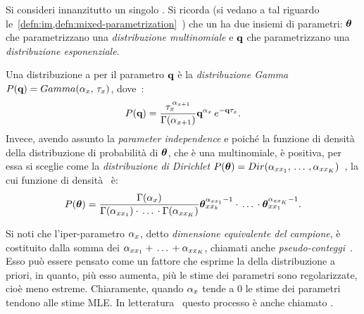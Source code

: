 Si consideri innanzitutto un singolo \mprocess*{}. Si ricorda (si vedano a tal riguardo le~\cref{defn:im,defn:mixed-parametrization}~) che un \mprocess*{} ha due insiemi di parametri: $\boldsymbol{\textbf{\text{$\theta$}}}$ che parametrizzano una \emph{distribuzione multinomiale} e $\boldsymbol{\textbf{\text{q}}}$ che parametrizzano una \emph{distribuzione esponenziale}.

Una distribuzione a  per il parametro $\boldsymbol{\textbf{\text{q}}}$ è la \emph{distribuzione Gamma} $P(\boldsymbol{\textbf{\text{q}}})=Gamma(\alpha_{\mathnormal{x}},\,\tau_{\mathnormal{x}})$, dove~\citep[si veda][]{Nodelman2007}:
\begin{equation}\label{eq:ctbn-bayesian-params-gamma}
P(\boldsymbol{\textbf{\text{q}}})=\frac{ \tau_{\mathnormal{x}}^{\,\alpha_{\mathnormal{x}+1}} }{ \Gamma(\alpha_{\mathnormal{x}+1}) } \boldsymbol{\textbf{\text{q}}}^{ \alpha_{\mathnormal{x}} } \, e^{ -\boldsymbol{\textbf{\text{q}}}\tau_{\mathnormal{x}} } \text{.}
\end{equation}
Invece, avendo assunto la \emph{parameter independence} e poiché la funzione di densità della distribuzione di probabilità di $\boldsymbol{\textbf{\text{$\theta$}}}$, che è una multinomiale, è positiva, per essa si sceglie come  la \emph{distribuzione di Dirichlet} $P(\boldsymbol{\textbf{\text{$\theta$}}})=Dir(\alpha_{\mathnormal{x}\mathnormal{x}_1},\,\dotsc\,,\alpha_{\mathnormal{x}\mathnormal{x}_K})$~\citep[si veda][]{Heckerman1996,Heckerman1995}, la cui funzione di densità~\citep{Steck2002} è:
\begin{equation}\label{eq:ctbn-bayesian-params-dirichlet}
P(\boldsymbol{\textbf{\text{$\theta$}}})=\frac{ \Gamma(\alpha_{\mathnormal{x}}) }{ \Gamma(\alpha_{\mathnormal{x}\mathnormal{x}_1}) \cdot \,\dotsc\, \cdot \Gamma(\alpha_{\mathnormal{x}\mathnormal{x}_K}) } \boldsymbol{\textbf{\text{$\theta$}}}_{\mathnormal{x}\mathnormal{x}_k}^{\alpha_{\mathnormal{x}\mathnormal{x}_1}-1} \cdot \,\dotsc\, \cdot \boldsymbol{\textbf{\text{$\theta$}}}_{\mathnormal{x}\mathnormal{x}_1}^{\alpha_{\mathnormal{x}\mathnormal{x}_K}-1} \text{.}
\end{equation}
\begin{notas}
Si noti che l'iper-parametro $\alpha_{\mathnormal{x}}$, detto \emph{dimensione equivalente del campione}, è costituito dalla somma dei \emph{} $\alpha_{\mathnormal{x}\mathnormal{x}_1} + \, \dotsc \, + \alpha_{\mathnormal{x}\mathnormal{x}_K}$, chiamati anche \emph{pseudo-conteggi}~\citep{Steck2002}. Esso può essere pensato come un fattore che esprime la \emph{} della distribuzione a priori, in quanto, più esso aumenta, più le stime dei parametri sono regolarizzate, cioè meno estreme. Chiaramente, quando $\alpha_{\mathnormal{x}}$ tende a $0$ le stime dei parametri tendono alle stime \acl{MLE}. In letteratura~\citep[si veda][]{Steck2002} questo processo è anche chiamato \emph{}.
\end{notas}
